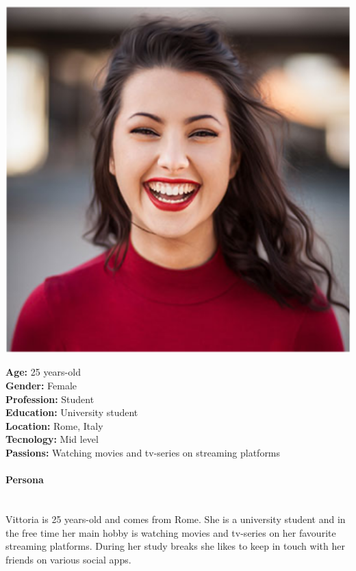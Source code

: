 \documentclass[12pt, a4paper]{article}
\begin{document}
\begin{minipage}{0.25\textwidth}
	\includegraphics[width=1\textwidth]{images/vittoria.png}
\end{minipage}
\hspace{0.02\linewidth}
\begin{minipage}{0.7\textwidth}
	\textbf{Age:} 25 years-old \\
	\textbf{Gender:} Female\\
	\textbf{Profession:} Student\\
	\textbf{Education:} University student\\
	\textbf{Location:} Rome, Italy\\
	\textbf{Tecnology:} Mid level\\
	\textbf{Passions:} Watching movies and tv-series on streaming platforms \\
\end{minipage}

\paragraph{Persona}\mbox{}\\
Vittoria is 25 years-old and comes from Rome. She is a university student and in the free
time her main hobby is watching movies and tv-series on her favourite streaming platforms.
During her study breaks she likes to keep in touch with her friends on various social apps.
\end{document}
